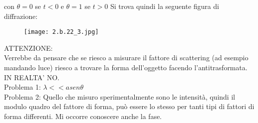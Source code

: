 \documentclass[twoside]{article}
\begin{document}
con $\theta=0$ se $t<0$ e  $\theta=1$ se $t>0$
Si trova quindi la seguente figura di diffrazione:
\begin{figure}[H]
    \centering
      \texttt{[image: 2.b.22\_3.jpg]}
\end{figure}
ATTENZIONE:\\
Verrebbe da pensare che se riesco a misurare il fattore di scattering (ad esempio mandando luce) riesco a trovare la forma dell'oggetto facendo l'antitrasformata. IN REALTA' NO. \\
Problema 1: $\lambda<< a sen\theta$\\
Problema 2: Quello che misuro sperimentalmente sono le intensità, quindi il modulo quadro del fattore di forma, può essere lo stesso per tanti tipi di fattori di forma differenti. Mi occorre conoscere anche la fase.
\end{document}
